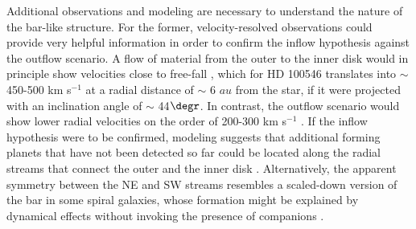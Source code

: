 \documentclass{aa}
\begin{document}
Additional observations and modeling are necessary to understand the nature of the bar-like structure. For the former, velocity-resolved observations could provide very helpful information in order to confirm the inflow hypothesis against the outflow scenario. A flow of material from the outer to the inner disk would in principle show velocities close to free-fall \citep{Rosenfeld14}, which for HD 100546 translates into $\sim$ 450-500 km s$^{-1}$ at a radial distance of $\sim$ 6 $au$ from the star, if it were projected with an inclination angle of $\sim$ 44$\degr$. In contrast, the outflow scenario would show lower radial velocities on the order of 200-300 km s$^{-1}$ \citep{Ellerbroek14}. If the inflow hypothesis were to be confirmed, modeling suggests that additional forming planets that have not been detected so far could be located along the radial streams that connect the outer and the inner disk \citep{Artymowicz96,Bryden99,Kley99,Lubow99,Lubow06}. Alternatively, the apparent symmetry between the NE and SW streams resembles a scaled-down version of the bar in some spiral galaxies, whose formation might be explained by dynamical effects without invoking the presence of companions \citep[see, e.g.,][and references therein]{Rosenfeld14}.  
\end{document}
